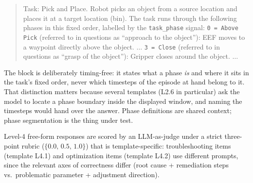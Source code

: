 \begin{quote}\small
    Task: Pick and Place. Robot picks an object from a source location and places it at a target location (bin). The task runs through the following phases in this fixed order, labelled by the \texttt{task\_phase} signal: \texttt{0 = Above Pick} (referred to in questions as ``approach to the object''): EEF moves to a waypoint directly above the object. $\ldots$ \texttt{3 = Close} (referred to in questions as ``grasp of the object''): Gripper closes around the object. $\ldots$
\end{quote}

\noindent The block is deliberately timing-free: it states what a phase \emph{is} and where it sits in the task's fixed order, never which timesteps of the episode at hand belong to it. That distinction matters because several templates (L2.6 in particular) ask the model to locate a phase boundary inside the displayed window, and naming the timesteps would hand over the answer. Phase definitions are shared context; phase segmentation is the thing under test.

Level-4 free-form responses are scored by an LLM-as-judge under a strict three-point rubric ($\{0.0,\,0.5,\,1.0\}$) that is template-specific: troubleshooting items (template L4.1) and optimization items (template L4.2) use different prompts, since the relevant axes of correctness differ (root cause + remediation steps vs.\ problematic parameter + adjustment direction).

